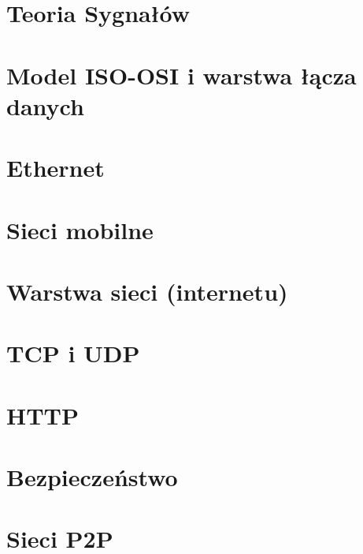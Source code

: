 \documentclass[12pt, a4paper, polish, openany]{book}
\begin{document}
\frontmatter



\tableofcontents


\mainmatter

\chapter{Teoria Sygnałów}


\chapter{Model ISO-OSI i warstwa łącza danych}


\chapter{Ethernet}


\chapter{Sieci mobilne}


\chapter{Warstwa sieci (internetu)}


\chapter{TCP i UDP}


\chapter{HTTP}


\chapter{Bezpieczeństwo}


\chapter{Sieci P2P}

\end{document}
